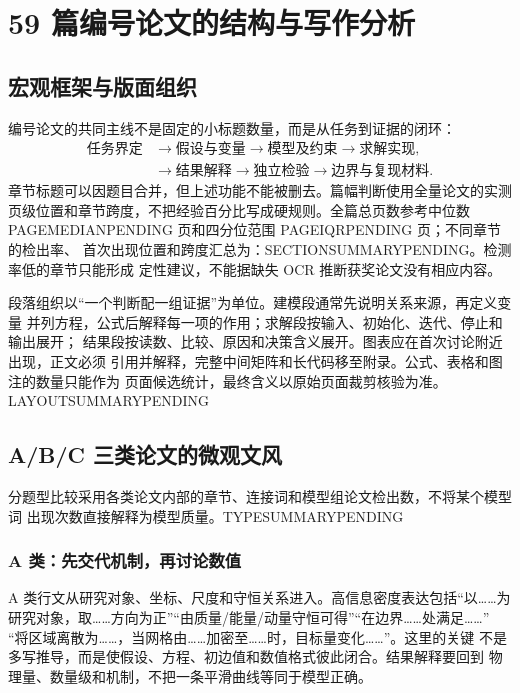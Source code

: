 \documentclass[UTF8,a4paper,12pt]{ctexart}
\newcommand{\CorpusPageMedian}{PAGEMEDIANPENDING}
\newcommand{\CorpusPageIQR}{PAGEIQRPENDING}
\newcommand{\CorpusSectionSummary}{SECTIONSUMMARYPENDING}
\newcommand{\CorpusLayoutSummary}{LAYOUTSUMMARYPENDING}
\newcommand{\CorpusTypeSummary}{TYPESUMMARYPENDING}
\begin{document}
\section{59 篇编号论文的结构与写作分析}

\subsection{宏观框架与版面组织}

编号论文的共同主线不是固定的小标题数量，而是从任务到证据的闭环：
\[
\begin{aligned}
\text{任务界定}&\longrightarrow\text{假设与变量}
\longrightarrow\text{模型及约束}\longrightarrow\text{求解实现},\\
&\longrightarrow\text{结果解释}
\longrightarrow\text{独立检验}\longrightarrow\text{边界与复现材料}.
\end{aligned}
\]
章节标题可以因题目合并，但上述功能不能被删去。篇幅判断使用全量论文的实测
页级位置和章节跨度，不把经验百分比写成硬规则。全篇总页数参考中位数
\CorpusPageMedian{} 页和四分位范围 \CorpusPageIQR{} 页；不同章节的检出率、
首次出现位置和跨度汇总为：\CorpusSectionSummary。检测率低的章节只能形成
定性建议，不能据缺失 OCR 推断获奖论文没有相应内容。

段落组织以“一个判断配一组证据”为单位。建模段通常先说明关系来源，再定义变量
并列方程，公式后解释每一项的作用；求解段按输入、初始化、迭代、停止和输出展开；
结果段按读数、比较、原因和决策含义展开。图表应在首次讨论附近出现，正文必须
引用并解释，完整中间矩阵和长代码移至附录。公式、表格和图注的数量只能作为
页面候选统计，最终含义以原始页面裁剪核验为准。\CorpusLayoutSummary

\subsection{A/B/C 三类论文的微观文风}

分题型比较采用各类论文内部的章节、连接词和模型组论文检出数，不将某个模型词
出现次数直接解释为模型质量。\CorpusTypeSummary

\subsubsection{A 类：先交代机制，再讨论数值}

A 类行文从研究对象、坐标、尺度和守恒关系进入。高信息密度表达包括“以……为
研究对象，取……方向为正”“由质量/能量/动量守恒可得”“在边界……处满足……”
“将区域离散为……，当网格由……加密至……时，目标量变化……”。这里的关键
不是多写推导，而是使假设、方程、初边值和数值格式彼此闭合。结果解释要回到
物理量、数量级和机制，不把一条平滑曲线等同于模型正确。
\end{document}
